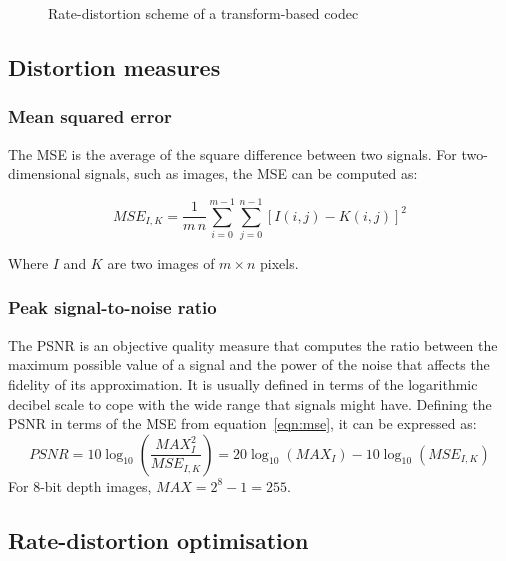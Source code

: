 \documentclass[11pt,a4paper,openright,twoside]{book}
\numberwithin{equation}{section} %
\begin{document}
\begin{figure}[ht]
	\centering
	
	\caption{Rate-distortion scheme of a transform-based codec}
	\label{fig:rate_distortion_scheme}
\end{figure}

\subsection{Distortion measures}
\label{sub:distortion_measures}

\subsubsection{Mean squared error}
\label{ssub:mean_squared_error}

The \ac{MSE} is the average of the square difference between two
signals.
For two-dimensional signals, such as images, the \ac{MSE} can be computed as:

\begin{equation}
	MSE_{I,K} = \frac{1}{m\,n} \sum\limits_{i=0}^{m-1} \sum\limits_{j=0}^{n-1}
	{\left[ I(i,j) - K(i,j) \right]} ^2
	\label{eqn:mse}
\end{equation}

Where $I$ and $K$ are two images of $m \times n$ pixels.

\subsubsection{Peak signal-to-noise ratio}
\label{ssub:peak_signal_to_noise_ratio}

The \ac{PSNR} is an objective quality measure that computes the ratio
between the maximum possible value of a signal and the power of the
noise that affects the fidelity of its approximation.
It is usually defined in terms of the logarithmic decibel scale to cope
with the wide range that signals might have.
Defining the \ac{PSNR} in terms of the \ac{MSE} from
equation~\ref{eqn:mse}, it can be expressed as:
\begin{equation}
	PSNR = 10 \log_{10} \left(\frac{MAX_I^2}{MSE_{I,K}}\right)
	= 20 \log_{10} (MAX_I) - 10 \log_{10} (MSE_{I,K})
	\label{eqn:psnr}
\end{equation}
For 8-bit depth images, $MAX = 2^{8} - 1 = 255$.

\subsection{Rate-distortion optimisation}
\label{sub:rate_distortion_optimisation}
\end{document}
